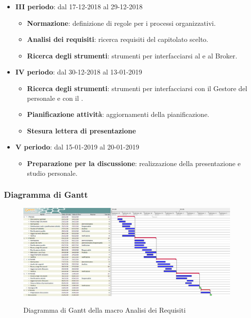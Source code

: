 \begin{itemize}
\begin{itemize}
			\end{itemize}
        	\item \textbf{III periodo}: dal 17-12-2018 al 29-12-2018
			\begin{itemize}
    	        \item \textbf{Normazione}: definizione di regole per i processi organizzativi.
    	        \item \textbf{Analisi dei requisiti}: ricerca requisiti del capitolato scelto.
       	        \item \textbf{Ricerca degli strumenti}: strumenti per interfacciarsi al  e al Broker.
        	\end{itemize}
        	\item \textbf{IV periodo}: dal 30-12-2018 al 13-01-2019
        	\begin{itemize}
       	        \item \textbf{Ricerca degli strumenti}: strumenti per interfacciarsi con il Gestore del personale e con il .
       	        \item \textbf{Pianificazione attività}: aggiornamenti della pianificazione.
       	        \item \textbf{Stesura lettera di presentazione}
        	\end{itemize}
        	\item \textbf{V periodo}: dal 15-01-2019 al 20-01-2019
        	\begin{itemize}
    	        \item \textbf{Preparazione per la discussione}: realizzazione della presentazione e studio personale.
        	\end{itemize}
		\end{itemize}

        \begin{landscape}
			\subsubsection{Diagramma di Gantt}        
			\begin{figure}[H]
					\centering
					\includegraphics[scale=0.4]{img/Analisi_dei_requisiti.png}\\
					\caption{Diagramma di Gantt della macro Analisi dei Requisiti}
			\end{figure}
		\end{landscape}
	
